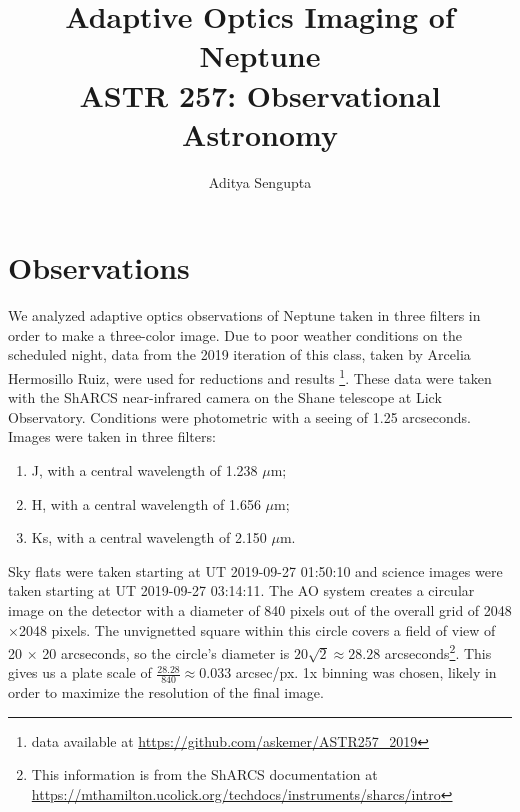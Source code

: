 \documentclass{article}
\title{Adaptive Optics Imaging of Neptune \\ ASTR 257: Observational Astronomy}
\author{Aditya Sengupta}
\begin{document}
    \maketitle
    \section{Observations}

    We analyzed adaptive optics observations of Neptune taken in three filters in order to make a three-color image. Due to poor weather conditions on the scheduled night, data from the 2019 iteration of this class, taken by Arcelia Hermosillo Ruiz, were used for reductions and results \footnote{data available at \href{https://github.com/askemer/ASTR257\_2019}{https://github.com/askemer/ASTR257\_2019}}. These data were taken with the ShARCS near-infrared camera on the Shane telescope at Lick Observatory\citep{sharcsmcgurk}. Conditions were photometric with a seeing of 1.25 arcseconds. Images were taken in three filters:

    \begin{enumerate}
        \item J, with a central wavelength of 1.238 $\mu$m;
        \item H, with a central wavelength of 1.656 $\mu$m;
        \item Ks, with a central wavelength of 2.150 $\mu$m.
    \end{enumerate}
    
    Sky flats were taken starting at UT 2019-09-27 01:50:10 and science images were taken starting at UT 2019-09-27 03:14:11. The AO system creates a circular image on the detector with a diameter of 840 pixels out of the overall grid of 2048$\times$2048 pixels. The unvignetted square within this circle covers a field of view of 20 $\times$ 20 arcseconds, so the circle's diameter is $20\sqrt{2} \approx 28.28$ arcseconds\footnote{This information is from the ShARCS documentation at \href{https://mthamilton.ucolick.org/techdocs/instruments/sharcs/intro/}{https://mthamilton.ucolick.org/techdocs/instruments/sharcs/intro}}. This gives us a plate scale of $\frac{28.28}{840} \approx 0.033$ arcsec/px. 1x binning was chosen, likely in order to maximize the resolution of the final image.
    
\end{document}
